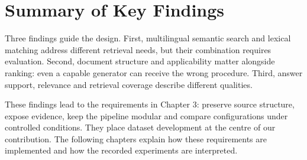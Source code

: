 \section{Summary of Key Findings}
Three findings guide the design. First, multilingual semantic search and lexical matching address different retrieval needs, but their combination requires evaluation. Second, document structure and applicability matter alongside ranking: even a capable generator can receive the wrong procedure. Third, answer support, relevance and retrieval coverage describe different qualities.

These findings lead to the requirements in Chapter 3: preserve source structure, expose evidence, keep the pipeline modular and compare configurations under controlled conditions. They place dataset development at the centre of our contribution. The following chapters explain how these requirements are implemented and how the recorded experiments are interpreted.

